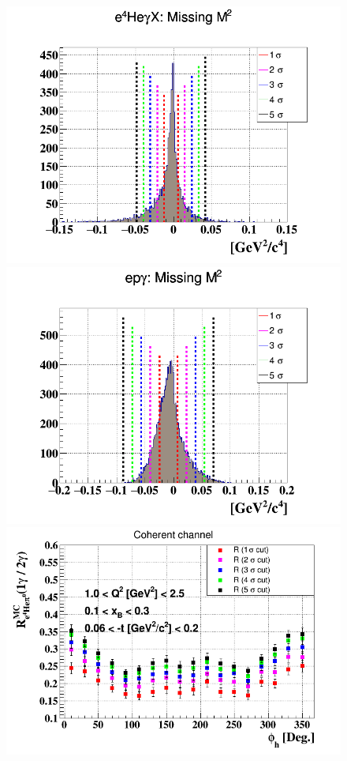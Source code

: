 \begin{figure}[h!]
\includegraphics[scale=0.31]{fig_dvcs/e4Hegamma_M2_Mis_sig.png}
\includegraphics[scale=0.31]{fig_dvcs/epgamma_M2_Mis_sig.png}
\includegraphics[scale=0.31]{fig_dvcs/e4Hegamma_e4Hepi0_Phi_2.png}

\end{figure}
